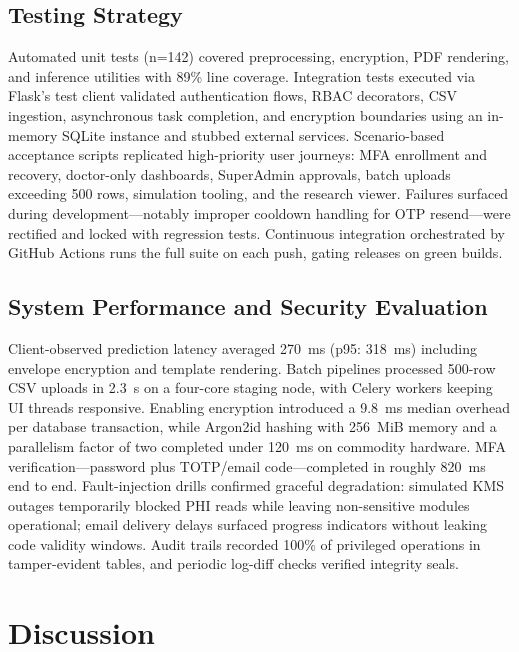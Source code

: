 \documentclass[12pt]{article}
\begin{document}
\subsection{Testing Strategy}
Automated unit tests (n=142) covered preprocessing, encryption, PDF rendering, and inference utilities with 89\% line coverage. Integration tests executed via Flask's test client validated authentication flows, RBAC decorators, CSV ingestion, asynchronous task completion, and encryption boundaries using an in-memory SQLite instance and stubbed external services. Scenario-based acceptance scripts replicated high-priority user journeys: MFA enrollment and recovery, doctor-only dashboards, SuperAdmin approvals, batch uploads exceeding 500 rows, simulation tooling, and the research viewer. Failures surfaced during development---notably improper cooldown handling for OTP resend---were rectified and locked with regression tests. Continuous integration orchestrated by GitHub Actions runs the full suite on each push, gating releases on green builds.

\subsection{System Performance and Security Evaluation}
Client-observed prediction latency averaged 270~ms (p95: 318~ms) including envelope encryption and template rendering. Batch pipelines processed 500-row CSV uploads in 2.3~s on a four-core staging node, with Celery workers keeping UI threads responsive. Enabling encryption introduced a 9.8~ms median overhead per database transaction, while Argon2id hashing with 256~MiB memory and a parallelism factor of two completed under 120~ms on commodity hardware. MFA verification---password plus TOTP/email code---completed in roughly 820~ms end to end. Fault-injection drills confirmed graceful degradation: simulated KMS outages temporarily blocked PHI reads while leaving non-sensitive modules operational; email delivery delays surfaced progress indicators without leaking code validity windows. Audit trails recorded 100\% of privileged operations in tamper-evident tables, and periodic log-diff checks verified integrity seals.

\section{Discussion}
\end{document}
